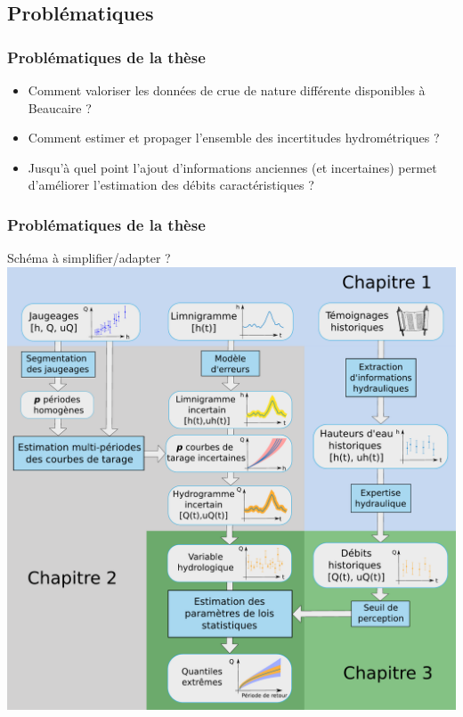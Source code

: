 \documentclass[compress,9pt]{beamer}
\begin{document}
	\subsection{Problématiques}
	\begin{frame}%
		\frametitle{Problématiques de la thèse}
      	\begin{itemize}
	      	\item<1->[$\vartriangleright$] Comment valoriser les données de crue de nature différente disponibles à Beaucaire ?\\
	      	\vspace{5pt}
	      	\item<2->[$\vartriangleright$] Comment estimer et propager l'ensemble des incertitudes hydrométriques ?\\
	      	\vspace{5pt}
	      	\item<3->[$\vartriangleright$] Jusqu'à quel point l'ajout d'informations anciennes (et incertaines) permet d'améliorer l'estimation des débits caractéristiques ?\\
	      	\vspace{5pt}
	      	
      	\end{itemize}
	\end{frame}
	
	\begin{frame}%
		\frametitle{Problématiques de la thèse}
		Schéma à simplifier/adapter ?\\
		\centering
		\includegraphics[width = .6\textwidth]{./Figures/SchemaThese.pdf} 
 	\end{frame}
	
\end{document}
